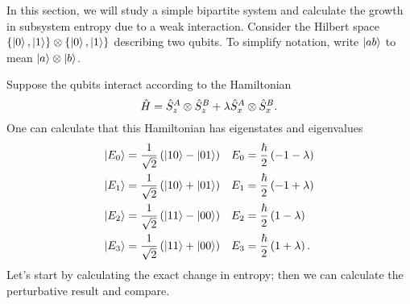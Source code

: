 In this section, we will study a simple bipartite system and calculate the growth in subsystem entropy due to a weak interaction. Consider the Hilbert space \(\{\left|0\right\rangle, \left|1\right\rangle\}\otimes\{\left|0\right\rangle, \left|1\right\rangle\}\) describing two qubits. To simplify notation, write \(\left|ab\right\rangle\) to mean \(\left|a\right\rangle\otimes\left|b\right\rangle\).

Suppose the qubits interact according to the Hamiltonian
\[
\hat{H} = \hat{S}_z^{A}\otimes\hat{S}_z^B + \lambda \hat{S}_x^A \otimes \hat{S}_x^B.
\]
One can calculate that this Hamiltonian has eigenstates and eigenvalues
\begin{align*}
\left|E_0\right\rangle &= \frac{1}{\sqrt{2}} \left(\left|10\right\rangle-\left|01\right\rangle\right) &
E_0 &= \frac{\hbar}{2} \left(-1-\lambda\right) \\
\left|E_1\right\rangle &= \frac{1}{\sqrt{2}} \left(\left|10\right\rangle+\left|01\right\rangle\right) &
E_1 &= \frac{\hbar}{2} \left(-1+\lambda\right) \\
\left|E_2\right\rangle &= \frac{1}{\sqrt{2}} \left(\left|11\right\rangle-\left|00\right\rangle\right) &
E_2 &= \frac{\hbar}{2} \left(1-\lambda\right) \\
\left|E_3\right\rangle &= \frac{1}{\sqrt{2}} \left(\left|11\right\rangle+\left|00\right\rangle\right) &
E_3 &= \frac{\hbar}{2} \left(1+\lambda\right).
\end{align*}
Let's start by calculating the exact change in entropy; then we can calculate the perturbative result and compare.

